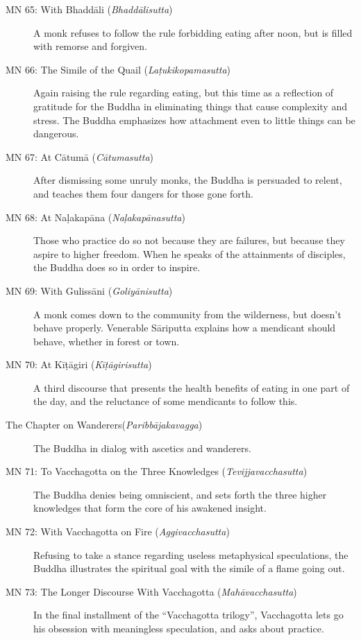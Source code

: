 \documentclass[12pt,openany]{book}%
\begin{document}
\begin{description}
\item[MN 65: With \textsanskrit{Bhaddāli} (\textit{\textsanskrit{Bhaddālisutta}})] A monk refuses to follow the rule forbidding eating after noon, but is filled with remorse and forgiven.%
\item[MN 66: The Simile of the Quail (\textit{\textsanskrit{Laṭukikopamasutta}})] Again raising the rule regarding eating, but this time as a reflection of gratitude for the Buddha in eliminating things that cause complexity and stress. The Buddha emphasizes how attachment even to little things can be dangerous.%
\item[MN 67: At \textsanskrit{Cātumā} (\textit{\textsanskrit{Cātumasutta}})] After dismissing some unruly monks, the Buddha is persuaded to relent, and teaches them four dangers for those gone forth.%
\item[MN 68: At \textsanskrit{Naḷakapāna} (\textit{\textsanskrit{Naḷakapānasutta}})] Those who practice do so not because they are failures, but because they aspire to higher freedom. When he speaks of the attainments of disciples, the Buddha does so in order to inspire.%
\item[MN 69: With \textsanskrit{Gulissāni} (\textit{\textsanskrit{Goliyānisutta}})] A monk comes down to the community from the wilderness, but doesn’t behave properly. Venerable \textsanskrit{Sāriputta} explains how a mendicant should behave, whether in forest or town.%
\item[MN 70: At \textsanskrit{Kīṭāgiri} (\textit{\textsanskrit{Kīṭāgirisutta}})] A third discourse that presents the health benefits of eating in one part of the day, and the reluctance of some mendicants to follow this.%
\item[The Chapter on Wanderers(\textit{\textsanskrit{Paribbājakavagga}})] The Buddha in dialog with ascetics and wanderers.%
\item[MN 71: To Vacchagotta on the Three Knowledges (\textit{\textsanskrit{Tevijjavacchasutta}})] The Buddha denies being omniscient, and sets forth the three higher knowledges that form the core of his awakened insight.%
\item[MN 72: With Vacchagotta on Fire (\textit{\textsanskrit{Aggivacchasutta}})] Refusing to take a stance regarding useless metaphysical speculations, the Buddha illustrates the spiritual goal with the simile of a flame going out.%
\item[MN 73: The Longer Discourse With Vacchagotta (\textit{\textsanskrit{Mahāvacchasutta}})] In the final installment of the “Vacchagotta trilogy”, Vacchagotta lets go his obsession with meaningless speculation, and asks about practice.%

\end{description}
\end{document}
